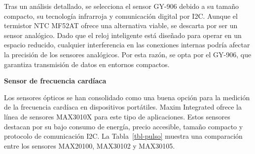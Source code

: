 \documentclass[
  12pt,
  letterpaper,
  DIV=11,
  numbers=noendperiod]{scrreport}
\begin{document}
Tras un análisis detallado, se selecciona el sensor GY-906 debido a su
tamaño compacto, su tecnología infrarroja y comunicación digital por
I2C. Aunque el termistor NTC MF52AT ofrece una alternativa viable, se
descarta por ser un sensor analógico. Dado que el reloj inteligente está
diseñado para operar en un espacio reducido, cualquier interferencia en
las conexiones internas podría afectar la precisión de los sensores
analógicos. Por esta razón, se opta por el GY-906, que garantiza
transmisión de datos en entornos compactos.

\textbf{Sensor de frecuencia cardíaca}

Los sensores ópticos se han consolidado como una buena opción para la
medición de la frecuencia cardíaca en dispositivos portátiles. Maxim
Integrated ofrece la línea de sensores MAX3010X para este tipo de
aplicaciones. Estos sensores destacan por su bajo consumo de energía,
precio accesible, tamaño compacto y protocolo de comunicación I2C. La
Tabla~\ref{tbl-pulso} muestra una comparación entre los sensores
MAX20100, MAX30102 y MAX30105.
\end{document}
